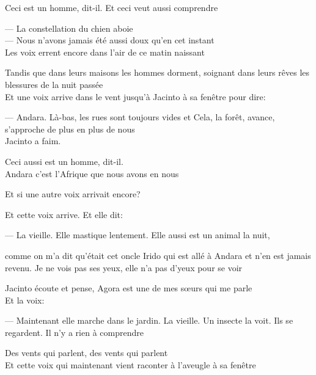 Ceci est un homme, dit-il. Et ceci veut aussi comprendre

\breakk

\vspace*{4cm}

--- La constellation du chien aboie\\

--- Nous n'avons jamais été aussi doux qu'en cet instant\\

Les voix errent encore dans l'air de ce matin naissant

Tandis que dans leurs maisons les hommes dorment, soignant dans leurs
rêves les blessures de la nuit passée\\

Et une voix arrive dans le vent jusqu'à Jacinto à sa fenêtre pour dire:

--- Andara. Là-bas, les rues sont toujours vides et Cela, la forêt,
avance, s'approche de plus en plus de nous\\

Jacinto a faim.

Ceci aussi est un homme, dit-il.\\

Andara c'est l'Afrique que nous avons en nous

\breakk

\vspace*{4cm}

Et si une autre voix arrivait encore?

Et cette voix arrive. Et elle dit:

--- La vieille. Elle mastique lentement. Elle aussi est un animal la nuit,

comme on m'a dit qu'était cet oncle Irido qui est allé à Andara et n'en
est jamais revenu. Je ne vois pas ses yeux, elle n'a pas d'yeux pour se
voir

Jacinto écoute et pense, Agora est une de mes sœurs qui me parle\\	

Et la voix:

--- Maintenant elle marche dans le jardin. La vieille. Un insecte la voit.
Ils se regardent. Il n'y a rien à comprendre

\breakk

\vspace*{4cm}

Des vents qui parlent, des vents qui parlent\\

Et cette voix qui maintenant vient raconter à l'aveugle à sa fenêtre

